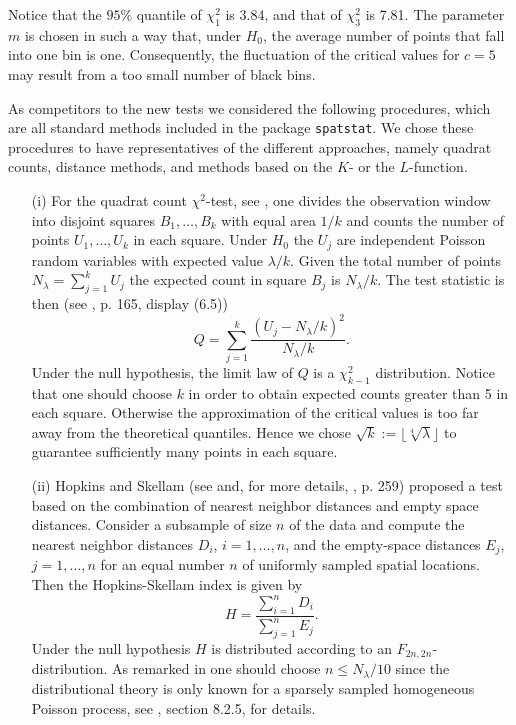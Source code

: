 \documentclass[12pt]{article}
\begin{document}
Notice that the $95\%$ quantile of $\chi^2_1$ is 3.84, and that of $\chi^2_3$ is 7.81.
The parameter $m$ is chosen in such a way that, under $H_0$, the average number of points that fall into one bin  is one.
 Consequently, the fluctuation of the critical values for $c=5$ may result from a too small number of black bins.

As competitors to the new tests we considered the following procedures, which are all standard methods included in the package {\tt spatstat}. We chose these procedures to have representatives of the different approaches, namely quadrat counts, distance methods, and methods based on the $K$- or the $L$-function.
\begin{itemize}
\item[(i)] For the quadrat count $\chi^2$-test, see \cite{spatstat}, one divides the observation window into disjoint squares $B_1,\ldots,B_k$
with equal area $1/k$ and counts the number of points $U_1,\ldots,U_k$ in each square.
Under $H_0$ the $U_j$ are independent Poisson random variables with expected value $\lambda/k$. Given the total number of points $N_\lambda=\sum_{j=1}^kU_j$ the expected count in square $B_j$ is $N_\lambda/k$. The test statistic is then (see \cite{spatstat}, p. 165, display (6.5))
    \begin{equation*}
    Q=\sum_{j=1}^k\frac{(U_j-N_\lambda/k)^2}{N_\lambda/k}.
    \end{equation*}
    Under the null hypothesis, the limit law of $Q$ is a $\chi^2_{k-1}$ distribution. Notice that one should choose $k$ in order to obtain expected counts greater than 5 in each square.
    Otherwise the approximation of the critical values is too far away from the theoretical quantiles. Hence we chose $\sqrt{k}:=\lfloor \sqrt[4]{\lambda}\rfloor$ to guarantee sufficiently many points in each square.

\item[(ii)] Hopkins and Skellam (see \cite{33,34} and, for more details, \cite{spatstat}, p. 259)
proposed a test based on the combination of nearest neighbor distances and empty space distances. Consider a subsample of size $n$ of the data and compute the nearest neighbor distances $D_i$, $i=1,\ldots,n$, and the empty-space distances $E_j$, $j=1,\ldots,n$ for an equal number $n$ of uniformly sampled spatial locations. Then the Hopkins-Skellam index is given by
    \begin{equation*}
    H=\frac{\sum_{i=1}^nD_i}{\sum_{j=1}^nE_j}.
    \end{equation*}
      Under the null hypothesis $H$ is distributed according to an $F_{2n,2n}$-distribution. As remarked in \cite{35} one should choose
      $n\le N_\lambda/10$ since the distributional theory is only known for a sparsely sampled homogeneous Poisson process, see \cite{15}, section 8.2.5, for details.



\end{itemize}
\end{document}
